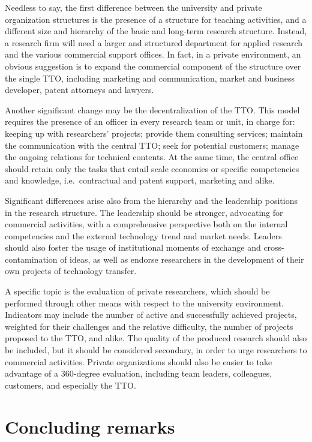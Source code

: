 Needless to say, the first difference between the university and private organization structures is the presence of a structure for teaching activities, and a different size and hierarchy of the basic and long-term research structure. Instead, a research firm will need a larger and structured department for applied research and the various commercial support offices. In fact, in a private environment, an obvious suggestion is to expand the commercial component of the structure over the single TTO, including marketing and communication, market and business developer, patent attorneys and lawyers.

Another significant change may be the decentralization of the TTO. This model requires the presence of an officer in every research team or unit, in charge for: keeping up with researchers' projects; provide them consulting services; maintain the communication with the central TTO; seek for potential customers; manage the ongoing relations for technical contents. At the same time, the central office should retain only the tasks that entail scale economies or specific competencies and knowledge, i.e.\ contractual and patent support, marketing and alike.

Significant differences arise also from the hierarchy and the leadership positions in the research structure. The leadership should be stronger, advocating for commercial activities, with a comprehensive perspective both on the internal competencies and the external technology trend and market needs. Leaders should also foster the usage of institutional moments of exchange and cross-contamination of ideas, as well as endorse researchers in the development of their own projects of technology transfer.

A specific topic is the evaluation of private researchers, which should be performed through other means with respect to the university environment. Indicators may include the number of active and successfully achieved projects, weighted for their challenges and the relative difficulty, the number of projects proposed to the TTO, and alike. The quality of the produced research should also be included, but it should be considered secondary, in order to urge researchers to commercial activities. Private organizations should also be easier to take advantage of a 360-degree evaluation, including team leaders, colleagues, customers, and especially the TTO. 

\section{Concluding remarks}